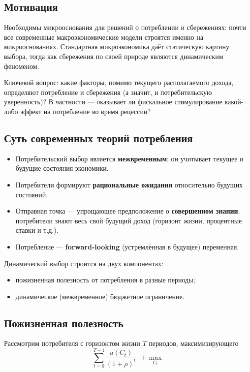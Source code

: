\documentclass[10pt,a4paper]{article}
\begin{document}
\subsection{Мотивация}
 
Необходимы микрооснования для решений о потреблении и сбережениях: почти все современные макроэкономические модели строятся именно на микрооснованиях. Стандартная микроэкономика даёт статическую картину выбора, тогда как сбережения по своей природе являются динамическим феноменом.
 
Ключевой вопрос: какие факторы, помимо текущего располагаемого дохода, определяют потребление и сбережения (а значит, и потребительскую уверенность)? В частности — оказывает ли фискальное стимулирование какой-либо эффект на потребление во время рецессии?
 
\subsection{Суть современных теорий потребления}
 
\begin{itemize}
\item Потребительский выбор является \textbf{межвременным}: он учитывает текущее и будущие состояния экономики.
\item Потребители формируют \textbf{рациональные ожидания} относительно будущих состояний.
\item Отправная точка — упрощающее предположение о \textbf{совершенном знании}: потребители знают весь свой будущий доход (горизонт жизни, процентные ставки и т.д.).
\item Потребление — \textbf{forward-looking} (устремлённая в будущее) переменная.
\end{itemize}
 
Динамический выбор строится на двух компонентах:
\begin{itemize}
\item пожизненная полезность от потребления в разные периоды;
\item динамическое (межвременное) бюджетное ограничение.
\end{itemize}
 
\subsection{Пожизненная полезность}
 
Рассмотрим потребителя с горизонтом жизни $T$ периодов, максимизирующего
\begin{equation}
\sum_{t=0}^{T-1} \frac{u(C_t)}{(1+\rho)^t} \longrightarrow \max_{C_t} \tag{2.1}
\end{equation}
 
\end{document}
